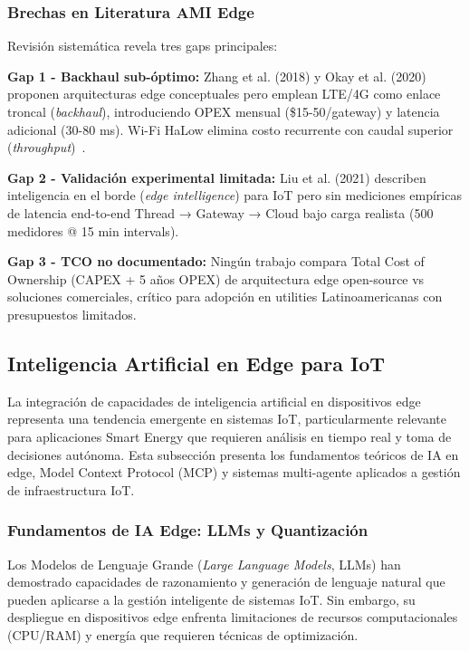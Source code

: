 \subsubsection{Brechas en Literatura AMI Edge}

Revisión sistemática revela tres gaps principales:

\textbf{Gap 1 - Backhaul sub-óptimo:} Zhang et al. (2018) y Okay et al. (2020) proponen arquitecturas edge conceptuales pero emplean LTE/4G como enlace troncal (\textit{backhaul}), introduciendo OPEX mensual (\$15-50/gateway) y latencia adicional (30-80 ms). Wi-Fi HaLow elimina costo recurrente con caudal superior (\textit{throughput})~\cite{alsafranChallengesImplementingIoT2025}.

\textbf{Gap 2 - Validación experimental limitada:} Liu et al. (2021) describen inteligencia en el borde (\textit{edge intelligence}) para IoT pero sin mediciones empíricas de latencia end-to-end Thread → Gateway → Cloud bajo carga realista (500 medidores @ 15 min intervals).

\textbf{Gap 3 - TCO no documentado:} Ningún trabajo compara Total Cost of Ownership (CAPEX + 5 años OPEX) de arquitectura edge open-source vs soluciones comerciales, crítico para adopción en utilities Latinoamericanas con presupuestos limitados.

\subsection{Inteligencia Artificial en Edge para IoT}
\label{sec:marco-estado-ia-edge}

La integración de capacidades de inteligencia artificial en dispositivos edge representa una tendencia emergente en sistemas IoT, particularmente relevante para aplicaciones Smart Energy que requieren análisis en tiempo real y toma de decisiones autónoma. Esta subsección presenta los fundamentos teóricos de IA en edge, Model Context Protocol (MCP) y sistemas multi-agente aplicados a gestión de infraestructura IoT.

\subsubsection{Fundamentos de IA Edge: LLMs y Quantización}
\label{sec:marco-estado-ia-fundamentos}

Los Modelos de Lenguaje Grande (\textit{Large Language Models}, LLMs) han demostrado capacidades de razonamiento y generación de lenguaje natural que pueden aplicarse a la gestión inteligente de sistemas IoT. Sin embargo, su despliegue en dispositivos edge enfrenta limitaciones de recursos computacionales (CPU/RAM) y energía que requieren técnicas de optimización.

